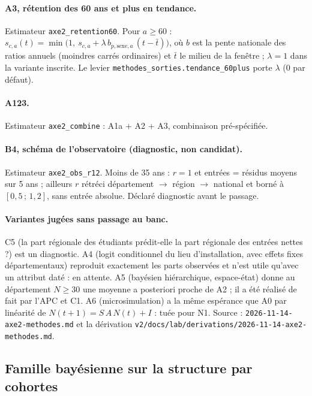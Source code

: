 \paragraph{A3, rétention des 60 ans et plus en tendance.} Estimateur \texttt{axe2\_retention60}. Pour
$a \ge 60$ :
$s_{c,a}(t) = \min\!\big(1,\ s_{c,a} + \lambda\, b_{p,\text{sexe},a}\,(t - \bar t)\big)$, où $b$ est la
pente nationale des ratios annuels (moindres carrés ordinaires) et $\bar t$ le milieu de la fenêtre ;
$\lambda = 1$ dans la variante inscrite. Le levier \texttt{methodes\_sorties.tendance\_60plus} porte
$\lambda$ (0 par défaut).

\paragraph{A123.} Estimateur \texttt{axe2\_combine} : A1a + A2 + A3, combinaison pré-spécifiée.

\paragraph{B4, schéma de l'observatoire (diagnostic, non candidat).} Estimateur \texttt{axe2\_obs\_r12}.
Moins de 35 ans : $r = 1$ et entrées = résidus moyens sur 5 ans ; ailleurs $r$ rétréci
département $\to$ région $\to$ national et borné à $[0{,}5\,;\,1{,}2]$, sans entrée absolue. Déclaré
diagnostic avant le passage.

\paragraph{Variantes jugées sans passage au banc.} C5 (la part régionale des étudiants prédit-elle la part
régionale des entrées nettes ?) est un diagnostic. A4 (logit conditionnel du lieu d'installation, avec effets
fixes départementaux) reproduit exactement les parts observées\derive{} et n'est utile qu'avec un attribut
daté : en attente. A5 (bayésien hiérarchique, espace-état) donne au département $N \ge 30$ une moyenne a
posteriori proche de A2\derive{} ; il a été réalisé de fait par l'APC et C1. A6 (microsimulation) a la
même espérance que A0 par linéarité de $N(t+1) = S\,A\,N(t) + I$\derive{} : tuée pour N1. Source :
\texttt{2026-11-14-axe2-methodes.md} et la dérivation \texttt{v2/docs/lab/derivations/2026-11-14-axe2-methodes.md}.

\subsection{Famille bayésienne sur la structure par cohortes}
\label{met:bayes}

